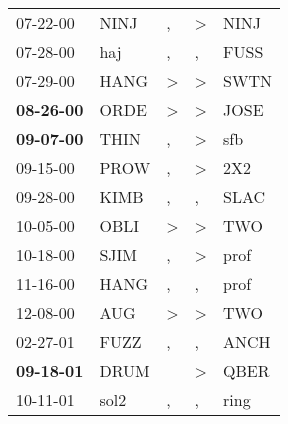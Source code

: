 \begin{supertabular}{p{0.07\textwidth}p{0.06\textwidth}p{0.02\textwidth}p{0.02\textwidth}p{0.06\textwidth}}
          07-22-00\textsuperscript{} &           NINJ\textsuperscript{} &             , &     \textgreater &           NINJ\textsuperscript{} \\
          07-28-00\textsuperscript{} &            haj\textsuperscript{} &             , &                , &           FUSS\textsuperscript{} \\
          07-29-00\textsuperscript{} &           HANG\textsuperscript{} &  \textgreater &     \textgreater &           SWTN\textsuperscript{} \\
 \textbf{08-26-00\textsuperscript{}} &           ORDE\textsuperscript{} &  \textgreater &     \textgreater &           JOSE\textsuperscript{} \\
 \textbf{09-07-00\textsuperscript{}} &           THIN\textsuperscript{} &             , &     \textgreater &            sfb\textsuperscript{} \\
          09-15-00\textsuperscript{} &           PROW\textsuperscript{} &             , &     \textgreater &            2X2\textsuperscript{} \\
          09-28-00\textsuperscript{} &           KIMB\textsuperscript{} &             , &                , &           SLAC\textsuperscript{} \\
          10-05-00\textsuperscript{} &           OBLI\textsuperscript{} &  \textgreater &     \textgreater &            TWO\textsuperscript{} \\
          10-18-00\textsuperscript{} &           SJIM\textsuperscript{} &             , &     \textgreater &           prof\textsuperscript{} \\
          11-16-00\textsuperscript{} &           HANG\textsuperscript{} &             , &                , &           prof\textsuperscript{} \\
          12-08-00\textsuperscript{} &            AUG\textsuperscript{} &  \textgreater &     \textgreater &            TWO\textsuperscript{} \\
          02-27-01\textsuperscript{} &           FUZZ\textsuperscript{} &             , &                , &           ANCH\textsuperscript{} \\
 \textbf{09-18-01\textsuperscript{}} &           DRUM\textsuperscript{} &               &     \textgreater &           QBER\textsuperscript{} \\
          10-11-01\textsuperscript{} &           sol2\textsuperscript{} &             , &                , &           ring\textsuperscript{} \\

\end{supertabular}

